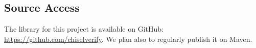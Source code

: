 \documentclass[conference]{IEEEtran}
\newcommand{\todo}[1]{{\color{olive} TODO: #1}}
\begin{document}
\subsection{Source Access}

The library for this project is available on GitHub:\\ \url{https://github.com/chiselverify}.
We plan also to regularly publish it on Maven.



\end{document}
